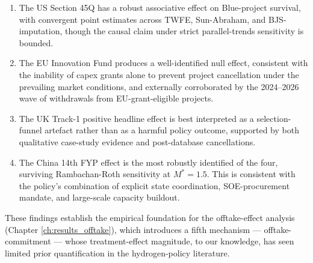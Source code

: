 \begin{enumerate}
\item The US Section 45Q has a robust associative effect on Blue-project survival, with convergent point estimates across TWFE, Sun-Abraham, and BJS-imputation, though the causal claim under strict parallel-trends sensitivity is bounded.

\item The EU Innovation Fund produces a well-identified null effect, consistent with the inability of capex grants alone to prevent project cancellation under the prevailing market conditions, and externally corroborated by the 2024--2026 wave of withdrawals from EU-grant-eligible projects.

\item The UK Track-1 positive headline effect is best interpreted as a selection-funnel artefact rather than as a harmful policy outcome, supported by both qualitative case-study evidence and post-database cancellations.

\item The China 14th FYP effect is the most robustly identified of the four, surviving Rambachan-Roth sensitivity at $M^* = 1.5$. This is consistent with the policy's combination of explicit state coordination, SOE-procurement mandate, and large-scale capacity buildout.
\end{enumerate}

These findings establish the empirical foundation for the offtake-effect analysis (Chapter \ref{ch:results_offtake}), which introduces a fifth mechanism --- offtake-commitment --- whose treatment-effect magnitude, to our knowledge, has seen limited prior quantification in the hydrogen-policy literature.
